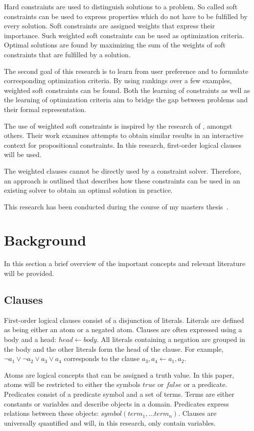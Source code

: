 \documentclass[letterpaper]{article}
\theoremstyle{definition}
\begin{document}
Hard constraints are used to distinguish solutions to a problem.
So called soft constraints can be used to express properties which do not have to be fulfilled by every solution.
Soft constraints are assigned weights that express their importance.
Such weighted soft constraints can be used as optimization criteria.
Optimal solutions are found by maximizing the sum of the weights of soft constraints that are fulfilled by a solution.

The second goal of this research is to learn from user preference and to formulate corresponding optimization criteria.
By using rankings over a few examples, weighted soft constraints can be found.
Both the learning of constraints as well as the learning of optimization criteria aim to bridge the gap between problems and their formal representation.

The use of weighted soft constraints is inspired by the research of \cite{campigotto2011active}, amongst others.
Their work examines attempts to obtain similar results in an interactive context for propositional constraints.
In this research, first-order logical clauses will be used.

The weighted clauses cannot be directly used by a constraint solver.
Therefore, an approach is outlined that describes how these constraints can be used in an existing solver to obtain an optimal solution in practice.

This research has been conducted during the course of my masters thesis~\cite{kolb2015thesis}.
\section{Background}
In this section a brief overview of the important concepts and relevant literature will be provided.

\subsection{Clauses}
First-order logical clauses consist of a disjunction of literals.
Literals are defined as being either an atom or a negated atom.
Clauses are often expressed using a body and a head: $\mathit{head} \leftarrow \mathit{body}$.
All literals containing a negation are grouped in the body and the other literals form the head of the clause.
For example, $\lnot a_1 \lor \lnot a_2 \lor a_3 \lor a_4$ corresponds to the clause $a_3, a_4 \leftarrow a_1, a_2$.

Atoms are logical concepts that can be assigned a truth value.
In this paper, atoms will be restricted to either the symbols $\mathit{true}$ or $\mathit{false}$ or a predicate.
Predicates consist of a predicate symbol and a set of terms.
Terms are either constants or variables and describe objects in a domain.
Predicates express relations between these objects: $\mathit{symbol}(\mathit{term_1}, ... \mathit{term_n})$.
Clauses are universally quantified and will, in this research, only contain variables.
\end{document}
